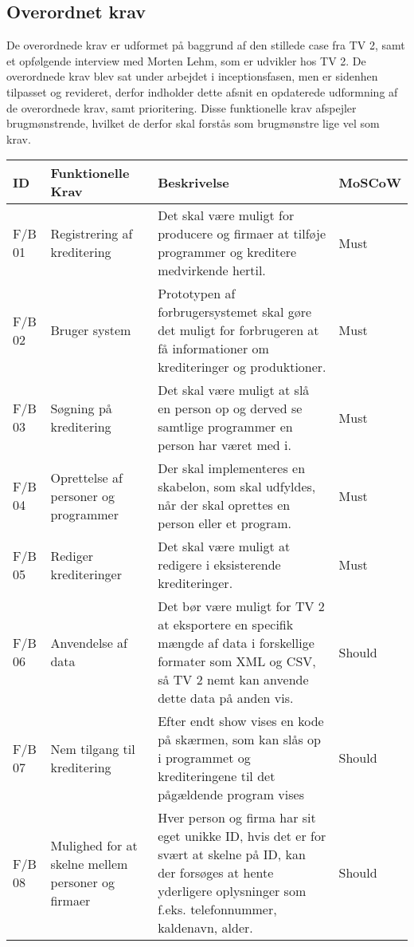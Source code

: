 \vfuzz=300pt
\hfuzz=300pt
\subsection{Overordnet krav}
De overordnede krav er udformet på baggrund af den stillede case fra TV 2, samt et opfølgende interview med Morten Lehm, som er udvikler hos TV 2. De overordnede krav blev sat under arbejdet i inceptionsfasen, men er sidenhen tilpasset og revideret, derfor indholder dette afsnit en opdaterede udformning af de overordnede krav, samt prioritering. Disse funktionelle krav afspejler brugmønstrende, hvilket de derfor skal forstås som brugmønstre lige vel som krav.

\begin{longtable}{|p{10mm}|p{40mm}|p{70mm}|p{20mm}|}
    \hline
    \textbf{ID} & \textbf{Funktionelle Krav} & \textbf{Beskrivelse} & \textbf{MoSCoW} \\
    \hline
    F/B 01 & Registrering af kreditering & Det skal være muligt for producere og firmaer at tilføje programmer og kreditere medvirkende hertil. & Must \\
    \hline
    F/B 02 & Bruger system & Prototypen af forbrugersystemet skal gøre det muligt for forbrugeren at få informationer om krediteringer og produktioner. & Must \\
    \hline
    F/B 03 & Søgning på kreditering & Det skal være muligt at slå en person op og derved se samtlige programmer en person har været med i. & Must \\
    \hline
    F/B 04 & Oprettelse af personer og programmer & Der skal implementeres en skabelon, som skal udfyldes, når der skal oprettes en person eller et program. & Must \\
    \hline
    F/B 05 & Rediger krediteringer & Det skal være muligt at redigere i eksisterende krediteringer. & Must \\
    \hline
    F/B 06 & Anvendelse af data & Det bør være muligt for TV 2 at eksportere en specifik  mængde af data i forskellige formater som XML og CSV, så TV 2 nemt kan anvende dette data på anden vis. & Should \\
    \hline
    F/B 07 & Nem tilgang til kreditering & Efter endt show vises en kode på skærmen, som kan slås op i programmet og krediteringene til det pågældende program vises & Should \\
    \hline
    F/B 08 & Mulighed for at skelne mellem personer og firmaer & Hver person og firma har sit eget unikke ID, hvis det er for svært at skelne på ID, kan der forsøges at hente yderligere oplysninger som f.eks. telefonnummer, kaldenavn, alder. & Should \\

\end{longtable}
